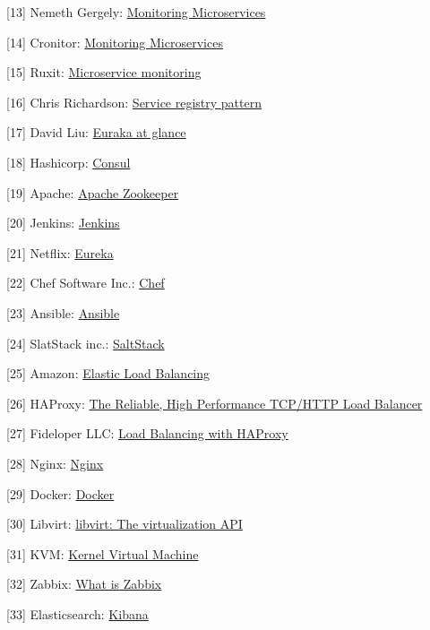 \documentclass[11pt,magyar,a4paper,oneside,]{report}
\begin{document}
{[}13{]} Nemeth Gergely:
\href{https://www.loggly.com/blog/monitoring-microservices-three-ways-to-overcome-the-biggest-challenges/}{Monitoring
Microservices}

{[}14{]} Cronitor:
\href{https://cronitor.io/help/micro-service-monitoring}{Monitoring
Microservices}

{[}15{]} Ruxit:
\href{https://ruxit.com/microservices/\#microservices_start}{Microservice
monitoring}

{[}16{]} Chris Richardson:
\href{http://microservices.io/patterns/service-registry.html}{Service
registry pattern}

{[}17{]} David Liu:
\href{https://github.com/Netflix/eureka/wiki/Eureka-at-a-glance}{Euraka
at glance}

{[}18{]} Hashicorp: \href{https://www.consul.io/}{Consul}

{[}19{]} Apache: \href{http://zookeeper.apache.org/}{Apache Zookeeper}

{[}20{]} Jenkins: \href{https://jenkins.io/index.html}{Jenkins}

{[}21{]} Netflix: \href{https://github.com/Netflix/eureka/wiki}{Eureka}

{[}22{]} Chef Software Inc.: \href{https://www.chef.io/chef/}{Chef}

{[}23{]} Ansible: \href{https://www.ansible.com/}{Ansible}

{[}24{]} SlatStack inc.: \href{http://saltstack.com/}{SaltStack}

{[}25{]} Amazon:
\href{https://aws.amazon.com/elasticloadbalancing/}{Elastic Load
Balancing}

{[}26{]} HAProxy: \href{http://www.haproxy.org/}{The Reliable, High
Performance TCP/HTTP Load Balancer}

{[}27{]} Fideloper LLC:
\href{https://serversforhackers.com/load-balancing-with-haproxy}{Load
Balancing with HAProxy}

{[}28{]} Nginx: \href{https://www.nginx.com/}{Nginx}

{[}29{]} Docker: \href{https://www.docker.com/}{Docker}

{[}30{]} Libvirt: \href{https://libvirt.org/}{libvirt: The
virtualization API}

{[}31{]} KVM: \href{http://www.linux-kvm.org/page/Main_Page}{Kernel
Virtual Machine}

{[}32{]} Zabbix: \href{http://www.zabbix.com/product.php}{What is
Zabbix}

{[}33{]} Elasticsearch:
\href{https://www.elastic.co/products/kibana}{Kibana}
\end{document}
